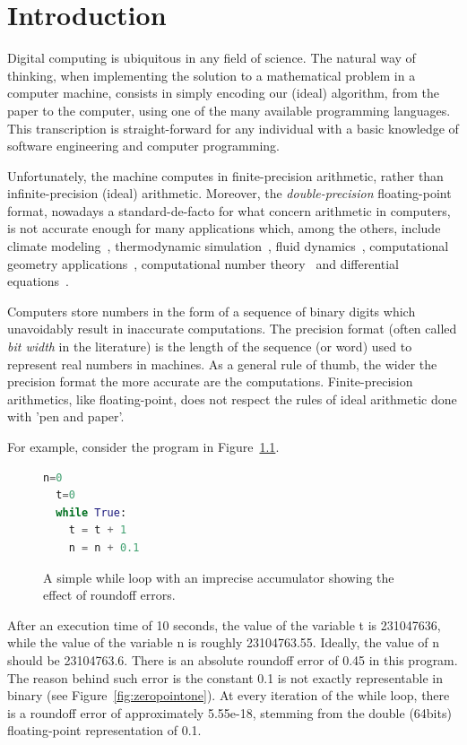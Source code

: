 
\chapter{Introduction}

\setupuuchapterbib
Digital computing is ubiquitous in any field of science.
%
The natural way of thinking, when implementing the solution to a mathematical problem in a computer machine, consists in simply encoding our (ideal) algorithm, from the paper to the computer, using one of the many available programming languages.
%
This transcription is straight-forward for any individual with a basic knowledge of software engineering and computer programming.
%

Unfortunately, the machine computes in finite-precision arithmetic, rather than infinite-precision (ideal) arithmetic. Moreover, the \emph{double-precision} floating-point format, nowadays a standard-de-facto for what concern arithmetic in computers, is not accurate enough for many applications which, among the others, include climate modeling~\cite{climate}, thermodynamic simulation~\cite{termodynamics}, fluid dynamics~\cite{fluiddynamics, statsfluiddynamics}, computational geometry applications~\cite{javaerror}, computational number theory~\cite{futurescience} and differential equations~\cite{differentialequations}.

%
Computers store numbers in the form of a sequence of binary digits which unavoidably result in inaccurate computations.
%
The precision format (often called \emph{bit width} in the literature) is the length of the sequence (or word) used to represent real numbers in machines.
%
As a general rule of thumb, the wider the precision format the more accurate are the computations.
%
Finite-precision arithmetics, like floating-point, does not respect the rules of ideal arithmetic done with 'pen and paper'. 
%

For example, consider the program in Figure~\ref{fig:while}.
%
\begin{figure}[h!]
	\begin{lstlisting}[frame=single, language=Python]
  n=0
  t=0
  while True:
    t = t + 1
    n = n + 0.1
	\end{lstlisting}
	\caption{A simple while loop with an imprecise accumulator showing the effect of roundoff errors.}\label{fig:while}
\end{figure}

%
After an execution time of 10 seconds, the value of the variable t is 231047636, while the value of the variable n is roughly 23104763.55.
%
Ideally, the value of n should be 23104763.6.
%
There is an absolute roundoff error of 0.45 in this program.
%
The reason behind such error is the constant 0.1 is not exactly representable in binary (see Figure~\ref{fig:zeropointone}). 
%
At every iteration of the while loop, there is a roundoff error of approximately 5.55e-18, stemming from the double (64bits) floating-point representation of 0.1. 
%

